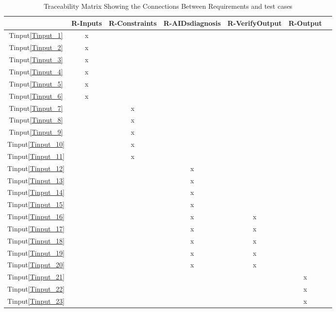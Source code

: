 \documentclass[12pt, titlepage]{article}
\newcommand{\tinref}[1]{Tinput\ref{#1}}
\begin{document}
\begin{enumerate}
\begin{enumerate}
\begin{landscape}
\begin{table}[ht]
\centering
\begin{tabular}{|c|c|c|c|c|c|c|}
\hline
	& R-Inputs & R-Constraints & R-AIDsdiagnosis & R-VerifyOutput 
& R-Output\\
\hline
\tinref{Tinput_1}        	&x & & & &  \\ 
\hline
\tinref{Tinput_2}			&x & & & &   \\ 
\hline
\tinref{Tinput_3}        	&x & & & &  \\ 
\hline
\tinref{Tinput_4}			&x & & & &   \\ 
\hline
\tinref{Tinput_5}        	&x & & & &  \\ 
\hline
\tinref{Tinput_6}			&x & & & &   \\ 
\hline
\tinref{Tinput_7}        	& &x & & &  \\ 
\hline
\tinref{Tinput_8}			& &x & & &   \\ 
\hline
\tinref{Tinput_9}        	& &x & & &  \\ 
\hline
\tinref{Tinput_10}			& &x & & &   \\ 
\hline
\tinref{Tinput_11}        	& &x & & &  \\ 
\hline
\tinref{Tinput_12}			& & &x & &   \\ 
\hline
\tinref{Tinput_13}        	& & &x & &  \\ 
\hline
\tinref{Tinput_14}			& & &x & &   \\ 
\hline
\tinref{Tinput_15}        	& & &x & &   \\  
\hline
\tinref{Tinput_16}			& & &x &x & \\ 
\hline
\tinref{Tinput_17}        	& & &x &x &   \\ 
\hline
\tinref{Tinput_18}			& & &x &x &   \\  
\hline
\tinref{Tinput_19}        	& & &x &x &   \\  
\hline
\tinref{Tinput_20}			& & &x &x &   \\  
\hline
\tinref{Tinput_21}        	& & & & &x  \\ 
\hline
\tinref{Tinput_22}			& & & & &x   \\ 
\hline
\tinref{Tinput_23}        	& & & & &x  \\ 
\hline
\end{tabular}
\caption{Traceability Matrix Showing the Connections Between Requirements and 
test cases}
\label{Table:R_trace}
\end{table}
\end{landscape}


\end{enumerate}
\end{enumerate}
\end{document}
